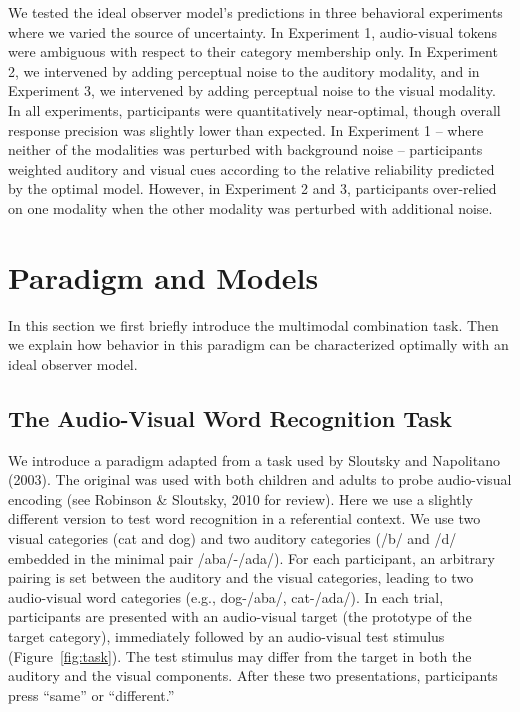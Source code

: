 \documentclass[english,floatsintext,man]{apa6}
\theoremstyle{definition}
\theoremstyle{definition}
\theoremstyle{definition}
\theoremstyle{remark}
\begin{document}
We tested the ideal observer model's predictions in three behavioral
experiments where we varied the source of uncertainty. In Experiment 1,
audio-visual tokens were ambiguous with respect to their category
membership only. In Experiment 2, we intervened by adding perceptual
noise to the auditory modality, and in Experiment 3, we intervened by
adding perceptual noise to the visual modality. In all experiments,
participants were quantitatively near-optimal, though overall response
precision was slightly lower than expected. In Experiment 1 -- where
neither of the modalities was perturbed with background noise --
participants weighted auditory and visual cues according to the relative
reliability predicted by the optimal model. However, in Experiment 2 and
3, participants over-relied on one modality when the other modality was
perturbed with additional noise.

\section{Paradigm and Models}\label{paradigm-and-models}

In this section we first briefly introduce the multimodal combination
task. Then we explain how behavior in this paradigm can be characterized
optimally with an ideal observer model.

\subsection{The Audio-Visual Word Recognition
Task}\label{the-audio-visual-word-recognition-task}

We introduce a paradigm adapted from a task used by Sloutsky and
Napolitano (2003). The original was used with both children and adults
to probe audio-visual encoding (see Robinson \& Sloutsky, 2010 for
review). Here we use a slightly different version to test word
recognition in a referential context. We use two visual categories (cat
and dog) and two auditory categories (/b/ and /d/ embedded in the
minimal pair /aba/-/ada/). For each participant, an arbitrary pairing is
set between the auditory and the visual categories, leading to two
audio-visual word categories (e.g., dog-/aba/, cat-/ada/). In each
trial, participants are presented with an audio-visual target (the
prototype of the target category), immediately followed by an
audio-visual test stimulus (Figure~\ref{fig:task}). The test stimulus
may differ from the target in both the auditory and the visual
components. After these two presentations, participants press
\enquote{same} or \enquote{different.}
\end{document}
